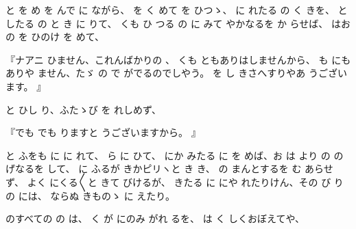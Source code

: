 と
を
め
を
んで
に
ながら、
を
く
めて
を
ひつゝ、
に
れたる
の
く
きを、
としたる
の
と
き
に
りて、
くも
ひ
つる
の
に
みて
やかなるを
か
らせば、
はお
の
を
ひのけ
を
めて、

『ナアニ
ひません、これんばかりの
、
くも
ともありはしませんから、
も
にもありや
ません、たゞ
の
で
がでるのでしやう。
を
し
きさへすりやあ
うございます。
』

と
ひし
り、ふたゝび
を
れしめず、

『でも
でも
りますと
うございますから。
』

と
ふをも
に
に
れて、
ら
に
ひて、
にか
みたる
に
を
めば、お
は
より
の
の
げなるを
して、
に
ふるが
きかピリヽと
き
き、
の
まんとするを
む
あらせず、
よく
にくる〳〵と
きて
びけるが、
きたる
に
にや
れたりけん、その
び
りの
には、
ならぬ
きものゝ
に
えたり。

のすべての
の
は、
く
が
にのみ
がれ
るを、
は
く
しくおぼえてや、

